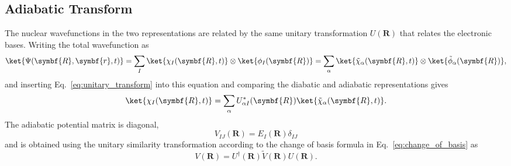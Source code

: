 \subsection{Adiabatic Transform}\label{sec:adiabatic_transform}
The nuclear wavefunctions in the two representations are related by the same unitary transformation $U(\symbf{R})$ that relates the electronic bases. Writing the total wavefunction as
\begin{equation}
\ket{\Psi(\symbf{R},\symbf{r},t)}=\sum_I\ket{\chi_I(\symbf{R},t)}\otimes\ket{\phi_I(\symbf{R})}=\sum_\alpha\ket{\tilde\chi_\alpha(\symbf{R},t)}\otimes\ket{\tilde\phi_\alpha(\symbf{R})},
\end{equation}
and inserting Eq.~\eqref{eq:unitary_transform} into this equation and comparing the diabatic and adiabatic representations gives
\begin{equation}
\ket{\chi_I(\symbf{R},t)}=\sum_\alpha U_{\alpha I}^\ast(\symbf{R})\ket{\tilde\chi_\alpha(\symbf{R},t)}.
\end{equation}
The adiabatic potential matrix is diagonal,
\begin{equation}
V_{IJ}(\symbf{R})=E_I(\symbf{R})\delta_{IJ}
\end{equation}
and is obtained using the unitary similarity transformation according to the change of basis formula in Eq.~\eqref{eq:change_of_basis} as
\begin{equation}
V(\symbf{R})=U^\dagger(\symbf{R})\tilde{V}(\symbf{R})U(\symbf{R}).
\end{equation}
